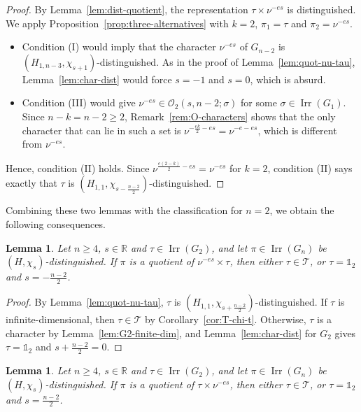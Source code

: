\documentclass[11pt]{amsart}
\numberwithin{equation}{section}
\theoremstyle{plain}
\newtheorem{lemma}[theorem]{Lemma}
\theoremstyle{definition}
\theoremstyle{remark}
\newcommand{\R}{\mathbb{R}}
\newcommand{\one}{\mathds{1}}
\newcommand{\T}{\mathcal{T}}
\DeclareMathOperator{\Irr}{Irr}
\begin{document}
\begin{proof}
	By Lemma~\ref{lem:dist-quotient}, the representation $\tau\times\nu^{-es}$ is distinguished. We apply Proposition~\ref{prop:three-alternatives} with $k=2$, $\pi_1=\tau$ and $\pi_2=\nu^{-es}$.
	\begin{itemize}
		\item Condition (I) would imply that the character $\nu^{-es}$ of $G_{n-2}$ is $(H_{1,n-3},\chi_{s+1})$-distinguished. As in the proof of Lemma~\ref{lem:quot-nu-tau}, Lemma~\ref{lem:char-dist} would force $s=-1$ and $s=0$, which is absurd.
		\item Condition (III) would give $\nu^{-es}\in\mathcal O_2(s,n-2;\sigma)$ for some $\sigma\in\Irr(G_1)$. Since $n-k=n-2\ge2$, Remark~\ref{rem:O-characters} shows that the only character that can lie in such a set is $\nu^{-\frac{ek}2-es}=\nu^{-e-es}$, which is different from $\nu^{-es}$.
	\end{itemize}
	Hence, condition (II) holds. Since $\nu^{\frac{e(2-k)}2-es}=\nu^{-es}$ for $k=2$, condition (II) says exactly that $\tau$ is $(H_{1,1},\chi_{s-\frac{n-2}2})$-distinguished.
\end{proof}

Combining these two lemmas with the classification for $n=2$, we obtain the following consequences.

\begin{lemma}\label{lem:tau-T-left}
	Let $n\ge4$, $s\in\R$ and $\tau\in\Irr(G_2)$, and let $\pi\in\Irr(G_n)$ be $(H,\chi_s)$-distinguished. If $\pi$ is a quotient of $\nu^{-es}\times\tau$, then either $\tau\in\T$, or $\tau=\one_2$ and $s=-\frac{n-2}2$.
\end{lemma}

\begin{proof}
	By Lemma~\ref{lem:quot-nu-tau}, $\tau$ is $(H_{1,1},\chi_{s+\frac{n-2}2})$-distinguished. If $\tau$ is infinite-dimensional, then $\tau\in\T$ by Corollary~\ref{cor:T-chi-t}. Otherwise, $\tau$ is a character by Lemma~\ref{lem:G2-finite-dim}, and Lemma~\ref{lem:char-dist} for $G_2$ gives $\tau=\one_2$ and $s+\frac{n-2}2=0$.
\end{proof}

\begin{lemma}\label{lem:tau-T-right}
	Let $n\ge4$, $s\in\R$ and $\tau\in\Irr(G_2)$, and let $\pi\in\Irr(G_n)$ be $(H,\chi_s)$-distinguished. If $\pi$ is a quotient of $\tau\times\nu^{-es}$, then either $\tau\in\T$, or $\tau=\one_2$ and $s=\frac{n-2}2$.
\end{lemma}
\end{document}
